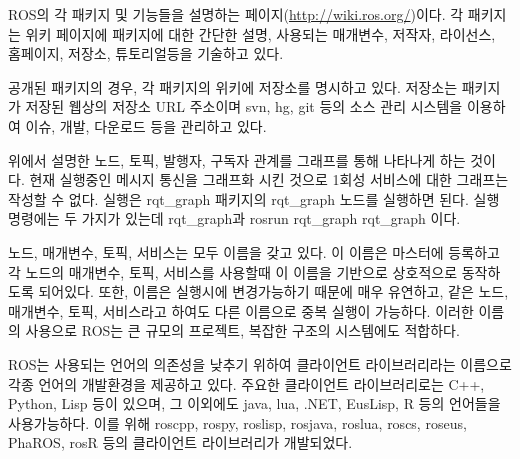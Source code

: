 \vspace{\baselineskip}
\begin{definition}\label{def:RosWiki}
ROS의 각 패키지 및 기능들을 설명하는 페이지(\url{http://wiki.ros.org/})이다. 각 패키지는 위키 페이지에 패키지에 대한 간단한 설명, 사용되는 매개변수, 저작자, 라이선스, 홈페이지, 저장소, 튜토리얼등을 기술하고 있다.
\end{definition}

\vspace{\baselineskip}
\begin{definition}\label{def:RosRepository}
공개된 패키지의 경우, 각 패키지의 위키에 저장소를 명시하고 있다. 저장소는 패키지가 저장된 웹상의 저장소 URL 주소이며 svn, hg, git 등의 소스 관리 시스템을 이용하여 이슈, 개발, 다운로드 등을 관리하고 있다.
\end{definition}

\vspace{\baselineskip}
\begin{definition}\label{def:RosGraph}
위에서 설명한 노드, 토픽, 발행자, 구독자 관계를 그래프를 통해 나타나게 하는 것이다. 현재 실행중인 메시지 통신을 그래프화 시킨 것으로 1회성 서비스에 대한 그래프는 작성할 수 없다. 실행은 rqt\_graph 패키지의 rqt\_graph 노드를 실행하면 된다. 실행 명령에는 두 가지가 있는데 rqt\_graph과 rosrun rqt\_graph rqt\_graph 이다.   
\end{definition}

\vspace{\baselineskip}
\begin{definition}[이름(name)]\label{def:RosName}
노드, 매개변수, 토픽, 서비스는 모두 이름을 갖고 있다. 이 이름은 마스터에 등록하고 각 노드의 매개변수, 토픽, 서비스를 사용할때 이 이름을 기반으로 상호적으로 동작하도록 되어있다. 또한, 이름은 실행시에 변경가능하기 때문에 매우 유연하고, 같은 노드, 매개변수, 토픽, 서비스라고 하여도 다른 이름으로 중복 실행이 가능하다. 이러한 이름의 사용으로 ROS는 큰 규모의 프로젝트, 복잡한 구조의 시스템에도 적합하다.  
\end{definition}

\vspace{\baselineskip}
\begin{definition}\label{def:RosClientLibray}
ROS는 사용되는 언어의 의존성을 낮추기 위하여 클라이언트 라이브러리라는 이름으로 각종 언어의 개발환경을 제공하고 있다. 주요한 클라이언트 라이브러리로는 C++, Python, Lisp 등이 있으며, 그 이외에도 java, lua, .NET, EusLisp, R 등의 언어들을 사용가능하다. 이를 위해 roscpp, rospy, roslisp, rosjava, roslua, roscs, roseus, PhaROS, rosR 등의 클라이언트 라이브러리가 개발되었다.
\end{definition}

